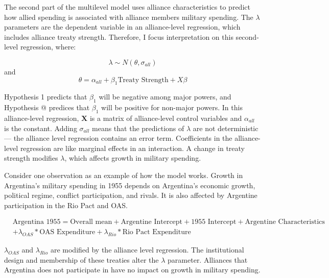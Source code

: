 \documentclass[12pt]{article}
\begin{document}
The second part of the multilevel model uses alliance characteristics to predict how allied spending is associated with alliance members military spending. 
The $\lambda$ parameters are the dependent variable in an alliance-level regression, which includes alliance treaty strength.
Therefore, I focus interpretation on this second-level regression, where: 

\begin{equation}
\lambda \sim N(\theta, \sigma_{all})
\end{equation} 
and 
\begin{equation}
\theta = \alpha_{all} + \beta_1 \mbox{Treaty Strength} + X \beta
\end{equation}

Hypothesis 1 predicts that $\beta_1$ will be negative among major powers, and Hypothesis @ predices that $\beta_1$ will be positive for non-major powers. 
In this alliance-level regression, $\textbf{X}$ is a matrix of alliance-level control variables and $\alpha_{all}$ is the constant.
Adding $\sigma_{all}$ means that the predictions of $\lambda$ are not deterministic--- the alliance level regression contains an error term. 
Coefficients in the alliance-level regression are like marginal effects in an interaction. 
A change in treaty strength modifies $\lambda$, which affects growth in military spending. 


Consider one observation as an example of how the model works. 
Growth in Argentina's military spending in 1955 depends on Argentina's economic growth, political regime, conflict participation, and rivals. 
It is also affected by Argentine participation in the Rio Pact and OAS. 


\begin{equation}
\begin{split}
& \mbox{Argentina 1955} = \mbox{Overall mean}
+ \mbox{Argentine Intercept} + \mbox{1955 Intercept} 
+ \mbox{Argentine Characteristics} \\
& + \lambda_{OAS} * \mbox{OAS Expenditure} + \lambda_{Rio} * \mbox{Rio Pact Expenditure}
\end{split} 
\end{equation}


$\lambda_{OAS}$ and $\lambda_{Rio}$ are modified by the alliance level regression. 
The institutional design and membership of these treaties alter the $\lambda$ parameter.
Alliances that Argentina does not participate in have no impact on growth in military spending.  
\end{document}
